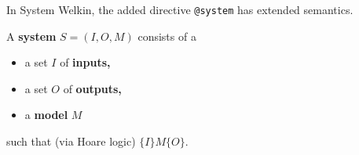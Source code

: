 \begin{itemize}

In System Welkin, the added directive \texttt{@system} has extended semantics.
\begin{definition}
  A \textbf{system} $S = (I, O, M)$ consists of a
  \begin{itemize}
    \item a set $I$ of \textbf{inputs,}
    \item a set $O$ of \textbf{outputs,}
    \item a \textbf{model} $M$
  \end{itemize}
  such that (via Hoare logic) $\{I\} M \{O\}.$
\end{definition}


\end{itemize}
